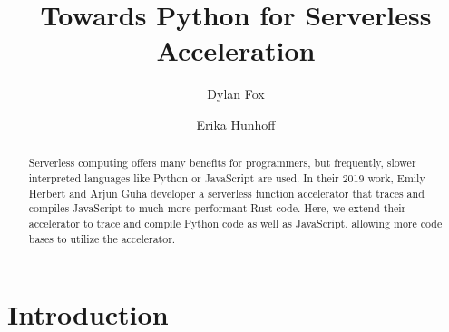 \documentclass[acmsmall,review,authorversion]{acmart}
\begin{document}
\title{Towards Python for Serverless Acceleration}

\author{Dylan Fox}
\author{Erika Hunhoff}

\begin{abstract}
     Serverless computing offers many benefits for programmers, but frequently, slower interpreted languages like Python or JavaScript are used. In their 2019 work, Emily Herbert and Arjun Guha developer a serverless function accelerator that traces and compiles JavaScript to much more performant Rust code. Here, we extend their accelerator to trace and compile Python code as well as JavaScript, allowing more code bases to utilize the accelerator.
\end{abstract}

\maketitle

\section{Introduction}
\end{document}
